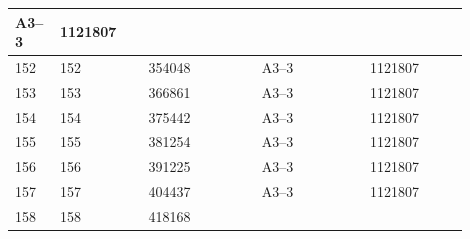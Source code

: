 \documentclass[UTF8,10pt,a4paper,fontset=fandol]{ctexart}
\newcommand{\fieldvalue}[1]{#1}
\begin{document}
\begin{center}
\begin{tabular}{|p{0.07\linewidth}|p{0.18\linewidth}|p{0.23\linewidth}|p{0.22\linewidth}|p{0.20\linewidth}|}
\fieldvalue{A3--3} &
\fieldvalue{1121807} & \\
\hline
152 &
\fieldvalue{152} &
\fieldvalue{354048} &
\fieldvalue{A3--3} &
\fieldvalue{1121807} & \\
\hline
153 &
\fieldvalue{153} &
\fieldvalue{366861} &
\fieldvalue{A3--3} &
\fieldvalue{1121807} & \\
\hline
154 &
\fieldvalue{154} &
\fieldvalue{375442} &
\fieldvalue{A3--3} &
\fieldvalue{1121807} & \\
\hline
155 &
\fieldvalue{155} &
\fieldvalue{381254} &
\fieldvalue{A3--3} &
\fieldvalue{1121807} & \\
\hline
156 &
\fieldvalue{156} &
\fieldvalue{391225} &
\fieldvalue{A3--3} &
\fieldvalue{1121807} & \\
\hline
157 &
\fieldvalue{157} &
\fieldvalue{404437} &
\fieldvalue{A3--3} &
\fieldvalue{1121807} & \\
\hline
158 &
\fieldvalue{158} &
\fieldvalue{418168} &

\end{tabular}
\end{center}
\end{document}
